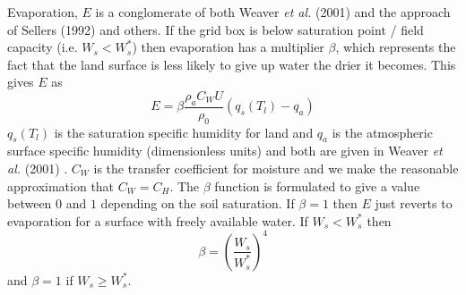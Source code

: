 \documentclass[10pt,a4paper]{report}
\begin{document}
Evaporation, $E$ is a conglomerate of both Weaver {\em et al.}
(2001) \cite{Uvic} and the approach of Sellers (1992) \cite{Sellers}
and others. If the grid box is below saturation point / field
capacity (i.e. $W_s<W_{s}^*$) then evaporation has a multiplier
$\beta$, which represents the fact that the land surface is less
likely to give up water the drier it becomes. This gives $E$ as
\begin{equation}
E = \beta \frac{\rho_{a} C_W U}{\rho_{0}}(q_s(T_l)-q_a)
\end{equation}
$q_s(T_{l})$ is the saturation specific humidity for land and $q_a$
is the atmospheric surface specific humidity (dimensionless units)
and both are given in Weaver {\em et al.} (2001) \cite{Uvic}.
$C_{W}$ is the transfer coefficient for moisture and we make the
reasonable approximation that $C_W=C_H$. The $\beta$ function is
formulated to give a value between $0$ and $1$ depending on the soil
saturation. If $\beta=1$ then $E$ just reverts to evaporation for a
surface with freely available water. If $W_s<W_{s}^*$ then
\begin{equation}
\beta = \left(\frac{W_s}{W_{s}^*}\right)^4
\end{equation}
and $\beta=1$ if $W_s\geq W_{s}^*$.

\end{document}
